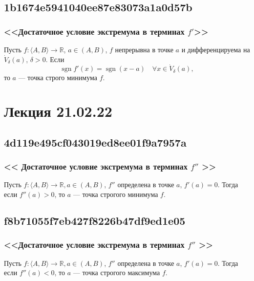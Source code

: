 \documentclass[11pt, a5paper]{article}
\let\oldsection\section
\renewcommand\section{\pagebreak\oldsection}
\newenvironment{note}[1]{\goodbreak\par\subsection{\hfill \color{lightgray}\tiny #1}}{}
\newenvironment{icloze}[2][\ldots]{%
  \ignorespaces\text{\tiny \color{lightgray}\{#2} %
}{%
  \text{\tiny\color{lightgray}\}}\unskip%
}
\begin{document}
\begin{note}{1b1674e5941040ee87e83073a1a0d57b}
    \subsubsection{<<Достаточное условие экстремума в терминах \( f' \)>>}

    Пусть \( f : \langle A, B \rangle \to \mathbb R \), \( a \in (A, B)  \), \( f \) непрерывна в точке \( a \) и дифференцируема на \( \dot V_{\delta} (a) \), \( \delta > 0 \).
    Если
    \begin{icloze}{1}\[
        \operatorname{sgn} f'(x) = \operatorname{sgn} (x - a) \quad \forall x \in \dot V_{\delta} (a),
    \]\end{icloze}
    то \begin{icloze}{2}\( a \) --- точка строго минимума \( f \).\end{icloze}
\end{note}

\section{Лекция 21.02.22}
\begin{note}{4d119e495cf043019ed8ee01f9a7957a}
    \subsubsection{<<\begin{icloze}{4}Достаточное условие экстремума в терминах \( f'' \) \end{icloze}>>}
    Пусть \begin{icloze}{3}\( f : \langle A, B \rangle \to \mathbb R, a \in (A, B) \), \( f'' \) определена в точке \( a \), \( f'(a) = 0 \).\end{icloze}
    Тогда если \begin{icloze}{1}\( f''(a) > 0 \),\end{icloze} то \begin{icloze}{2}\( a \) --- точка строгого минимума \( f \).\end{icloze}
\end{note}

\begin{note}{f8b71055f7eb427f8226b47df9ed1e05}
    \subsubsection{<<Достаточное условие экстремума в терминах \( f'' \) >>}
    Пусть \( f : \langle A, B \rangle \to \mathbb R, a \in (A, B) \), \( f'' \) определена в точке \( a \), \( f'(a) = 0 \).
    Тогда если \begin{icloze}{1}\( f''(a) < 0 \),\end{icloze} то \begin{icloze}{2}\( a \) --- точка строгого максимума \( f \).\end{icloze}
\end{note}
\end{document}
